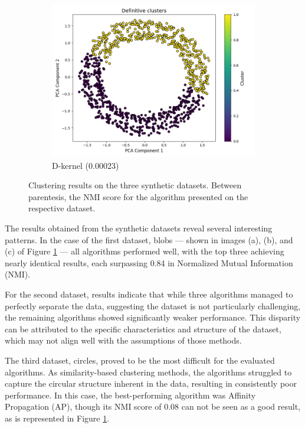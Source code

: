 \documentclass[
	10pt,
	parskip=half-,	
	paper=a4,
	english
	]{scrartcl}
\begin{document}
\begin{figure}[ht]
\begin{subfigure}[b]{0.3\textwidth}
        \includegraphics[width=\textwidth]{../data/plots/synthetic_noise_circles_circles_D-kernel_structural_0.png}
        \caption{D-kernel (0.00023)}
    \end{subfigure}

    \caption{Clustering results on the three synthetic datasets. Between parentesis, the NMI score for the algorithm presented on the respective dataset.}
    \label{fig:synthetic_results_grid}
\end{figure}

The results obtained from the synthetic datasets reveal several interesting patterns. In the case of the first dataset, blobs — shown in images (a), (b), and (c) of Figure \ref{fig:synthetic_results_grid} — all algorithms performed well, with the top three achieving nearly identical results, each surpassing 0.84 in Normalized Mutual Information (NMI).

For the second dataset, results indicate that while three algorithms managed to perfectly separate the data, suggesting the dataset is not particularly challenging, the remaining algorithms showed significantly weaker performance. This disparity can be attributed to the specific characteristics and structure of the dataset, which may not align well with the assumptions of those methods.

The third dataset, circles, proved to be the most difficult for the evaluated algorithms. As similarity-based clustering methods, the algorithms struggled to capture the circular structure inherent in the data, resulting in consistently poor performance. In this case, the best-performing algorithm was Affinity Propagation (AP), though its NMI score of 0.08 can not be seen as a good result, as is represented in Figure \ref{fig:synthetic_results_grid}.
\end{document}
